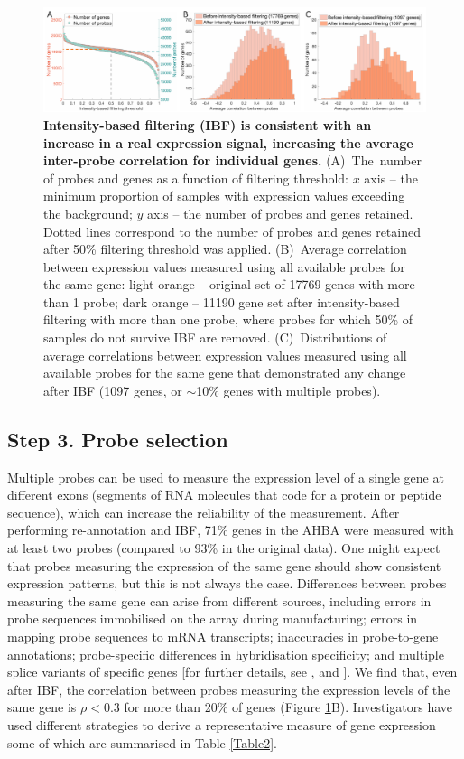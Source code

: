 \begin{figure}[h!]
  \centering
    \includegraphics[width=1\textwidth]{Chapter4/Ch4Fig3.pdf}
\caption{\textbf{Intensity-based filtering (IBF) is consistent with an increase in a real expression signal, increasing the average inter-probe correlation for individual genes.} \mbox{(A) The number} of probes and genes as a function of filtering threshold: $x$ axis – the minimum proportion of samples with expression values exceeding the background; $y$ axis – the number of probes and genes retained. Dotted lines correspond to the number of probes and genes retained after 50\% filtering threshold was applied.
\mbox{(B) Average} correlation between expression values measured using all available probes for the same gene: light orange -- original set of \num{17769} genes with more than 1 probe; dark orange -- \num{11190} gene set after intensity-based filtering with more than one probe, where probes for which 50\% of samples do not survive IBF are removed.
\mbox{(C) Distributions} of average correlations between expression values measured using all available probes for the same gene that demonstrated any change after IBF (1097 genes, or $\sim$10\% genes with multiple probes). }

\label{fig:Ch4Fig3}
\end{figure}

\subsection{Step 3. Probe selection}

Multiple probes can be used to measure the expression level of a single gene at different exons (segments of RNA molecules that code for a protein or peptide sequence), which can increase the reliability of the measurement. After performing re-annotation and IBF, 71\% genes in the AHBA were measured with at least two probes (compared to 93\% in the original data). One might expect that probes measuring the expression of the same gene should show consistent expression patterns, but this is not always the case. Differences between probes measuring the same gene can arise from different sources, including errors in probe sequences immobilised on the array during manufacturing; errors in mapping probe sequences to mRNA transcripts; inaccuracies in probe-to-gene annotations; probe-specific differences in hybridisation specificity; and multiple splice variants of specific genes [for further details, see \citet{Liu2010}, and \citep{Jaksik2015}]. We find that, even after IBF, the correlation between probes measuring the expression levels of the same gene is $\rho < 0.3$ for more than 20\% of genes (Figure \ref{fig:Ch4Fig3}B). Investigators have used different strategies to derive a representative measure of gene expression some of which are summarised in Table \ref{Table2}.

